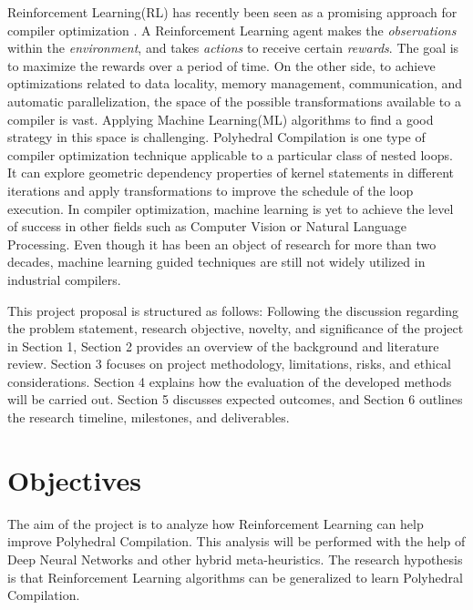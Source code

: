 \documentclass[logo,msc]{infthesis}           %
\begin{document}
Reinforcement Learning(RL) has recently been seen as a promising approach for compiler optimization \cite{8357388}\cite{9232934}. A Reinforcement Learning agent makes the \textit{observations} within the \textit{environment}, and takes \textit{actions} to receive certain \textit{rewards}. The goal is to maximize the rewards over a period of time. On the other side, to achieve optimizations related to data locality, memory management, communication, and automatic parallelization, the space of the possible transformations available to a compiler is vast. Applying Machine Learning(ML) algorithms to find a good strategy in this space is challenging. Polyhedral Compilation is one type of compiler optimization technique applicable to a particular class of nested loops. It can explore geometric dependency properties of kernel statements in different iterations and apply transformations to improve the schedule of the loop execution. In compiler optimization, machine learning is yet to achieve the level of success in other fields such as Computer Vision or Natural Language Processing. Even though it has been an object of research for more than two decades, machine learning guided techniques are still not widely utilized in industrial compilers.

This project proposal is structured as follows: Following the discussion regarding the problem statement, research objective, novelty, and significance of the project in Section 1, Section 2 provides an overview of the background and literature review. Section 3 focuses on project methodology, limitations, risks, and ethical considerations. Section 4 explains how the evaluation of the developed methods will be carried out. Section 5 discusses expected outcomes, and Section 6 outlines the research timeline, milestones, and deliverables.

\section{Objectives}

The aim of the project is to analyze how Reinforcement Learning can help improve Polyhedral Compilation. This analysis will be performed with the help of Deep Neural Networks and other hybrid meta-heuristics. The research hypothesis is that Reinforcement Learning algorithms can be generalized to learn Polyhedral Compilation.
\end{document}
